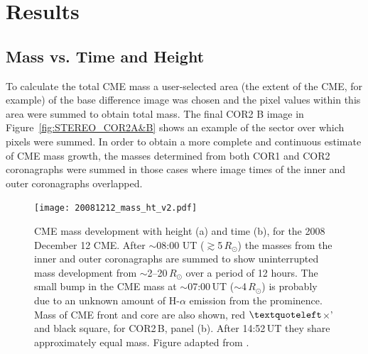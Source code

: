 

\section{Results}\label{sec:11}
\subsection{Mass vs. Time and Height}

To calculate the total CME mass a user-selected area (the extent of the CME, for example) of the base difference image was chosen and the pixel values within this area were summed to obtain total mass. The final COR2 B image in Figure~\ref{fig:STEREO_COR2A&B} shows an example of the sector over which pixels were summed. In order to obtain a more complete and continuous estimate of CME mass growth, the masses determined from both COR1 and COR2 coronagraphs were summed in those cases where image times of the inner and outer coronagraphs overlapped. 
\begin{figure}[!t]
\begin{center}
\texttt{[image: 20081212\_mass\_ht\_v2.pdf]}
\caption[CME mass as a function of height and time]{{\color{black}CME mass development with height (a) and time (b), for the 2008 December 12 CME. After $\sim$08:00 UT ($\gtrsim$5\,$R_{\odot}$) the masses from the inner and outer coronagraphs are summed to show uninterrupted mass development from $\sim$2--20\,$R_{\odot}$ over a period of 12 hours. The small bump in the CME mass at $\sim$07:00\,UT ($\sim$4\,$R_{\odot}$) is probably due to an unknown amount of H-$\alpha$ emission from the prominence. Mass of CME front and core are also shown, red $\textquoteleft$$\times$' and black square, for COR2\,B, panel (b). After 14:52\,UT they share approximately equal mass. Figure adapted from \citet{carley2012}.}} %
\label{fig:20081212_mass_ht}
\end{center}
\end{figure}

